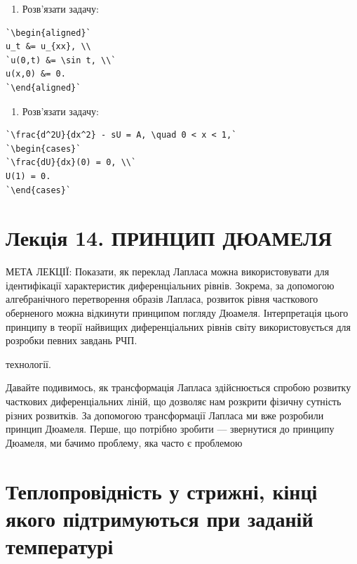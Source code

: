 \documentclass[
  ukrainian,
]{article}
\providecommand{\tightlist}{%
  \setlength{\itemsep}{0pt}\setlength{\parskip}{0pt}}
\begin{document}
\begin{enumerate}
\def\labelenumi{\arabic{enumi}.}
\setcounter{enumi}{2}
\tightlist
\item
  Розв'язати задачу:
\end{enumerate}

\begin{verbatim}
`\begin{aligned}`
u_t &= u_{xx}, \\
`u(0,t) &= \sin t, \\`
u(x,0) &= 0.
`\end{aligned}`
\end{verbatim}

\begin{enumerate}
\def\labelenumi{\arabic{enumi}.}
\setcounter{enumi}{3}
\tightlist
\item
  Розв'язати задачу:
\end{enumerate}

\begin{verbatim}
`\frac{d^2U}{dx^2} - sU = A, \quad 0 < x < 1,`
`\begin{cases}`
`\frac{dU}{dx}(0) = 0, \\`
U(1) = 0.
`\end{cases}`
\end{verbatim}

\section{Лекція 14. ПРИНЦИП
ДЮАМЕЛЯ}\label{ux43bux435ux43aux446ux456ux44f-14.-ux43fux440ux438ux43dux446ux438ux43f-ux434ux44eux430ux43cux435ux43bux44f}

МЕТА ЛЕКЦІЇ: Показати, як переклад Лапласа можна використовувати для
ідентифікації характеристик диференціальних рівнів. Зокрема, за
допомогою алгебранічного перетворення образів Лапласа, розвиток рівня
часткового оберненого можна відкинути принципом погляду Дюамеля.
Інтерпретація цього принципу в теорії найвищих диференціальних рівнів
світу використовується для розробки певних завдань РЧП.

технології.

Давайте подивимось, як трансформація Лапласа здійснюється спробою
розвитку часткових диференціальних ліній, що дозволяє нам розкрити
фізичну сутність різних розвитків. За допомогою трансформації Лапласа ми
вже розробили принцип Дюамеля. Перше, що потрібно зробити --- звернутися
до принципу Дюамеля, ми бачимо проблему, яка часто є проблемою

\section{Теплопровідність у стрижні, кінці якого підтримуються при
заданій
температурі}\label{ux442ux435ux43fux43bux43eux43fux440ux43eux432ux456ux434ux43dux456ux441ux442ux44c-ux443-ux441ux442ux440ux438ux436ux43dux456-ux43aux456ux43dux446ux456-ux44fux43aux43eux433ux43e-ux43fux456ux434ux442ux440ux438ux43cux443ux44eux442ux44cux441ux44f-ux43fux440ux438-ux437ux430ux434ux430ux43dux456ux439-ux442ux435ux43cux43fux435ux440ux430ux442ux443ux440ux456}
\end{document}
